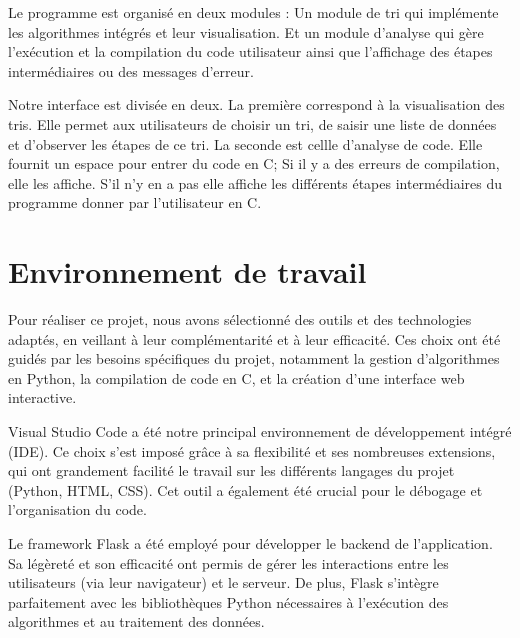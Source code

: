 \documentclass[a4paper, 12pt, twoside]{article}
\begin{document}
Le programme est organisé en deux modules :
\newline
Un module de tri qui implémente les algorithmes intégrés et leur visualisation.
\newline
Et un module d’analyse qui gère l’exécution et la compilation du code utilisateur ainsi que l’affichage des étapes intermédiaires ou des messages d’erreur.
\newline

Notre interface est divisée en deux. 
La première correspond à la visualisation des tris. Elle permet aux utilisateurs de choisir un tri, de saisir une liste de données et d’observer les étapes de ce tri.
\newline
La seconde est cellle d’analyse de code. Elle fournit un espace pour entrer du code en C; Si il y a des erreurs de compilation, elle les affiche. S'il n'y en a pas elle affiche les différents étapes intermédiaires du programme donner par l'utilisateur en C.

\vspace{30pt}

\newpage
\section{Environnement de travail}
\vspace{40pt}
Pour réaliser ce projet, nous avons sélectionné des outils et des technologies adaptés, en veillant à leur complémentarité et à leur efficacité. Ces choix ont été guidés par les besoins spécifiques du projet, notamment la gestion d’algorithmes en Python, la compilation de code en C, et la création d’une interface web interactive.
\newline

Visual Studio Code a été notre principal environnement de développement intégré (IDE). Ce choix s’est imposé grâce à sa flexibilité et ses nombreuses extensions, qui ont grandement facilité le travail sur les différents langages du projet (Python, HTML, CSS). Cet outil a également été crucial pour le débogage et l’organisation du code.
\newline

Le framework Flask a été employé pour développer le backend de l’application. Sa légèreté et son efficacité ont permis de gérer les interactions entre les utilisateurs (via leur navigateur) et le serveur. De plus, Flask s’intègre parfaitement avec les bibliothèques Python nécessaires à l’exécution des algorithmes et au traitement des données.
\newline
\end{document}
